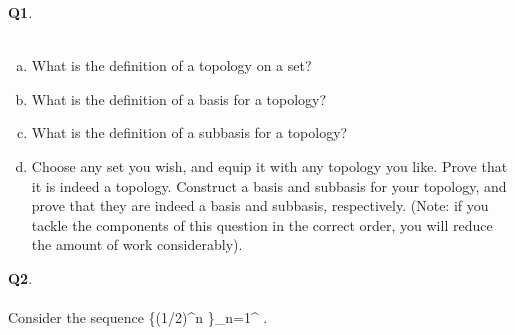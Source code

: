 \documentclass[12pt, oneside]{amsart}
\newcommand{\rr}{\mathbb{R}}
\begin{document}
\vfill


\newpage
\noindent
 \textbf{Q1}. \\ \\ 
\begin{enumerate}[a)]
  \item
    What is the definition of a topology on a set?
    \vspace{3cm}
  \item
    What is the definition of a basis for a topology?
    \vspace{3cm}
  \item 
    What is the definition of a subbasis for a topology?
        \vspace{3cm}

  \item
    Choose any set you wish, and equip it with any topology you like. Prove that it is indeed a topology. Construct a basis and subbasis for your topology, and prove that they are indeed a basis and subbasis, respectively. (Note: if you tackle the components of this question in the correct order, you will reduce the amount of work considerably). 
\end{enumerate}

\newpage
\noindent
\textbf{Q2}.\\ \\ Consider the sequence
 \left \{(1/2)^{n} \right\}_{n=1}^{\infty} \subset \rr.
\end{document}
